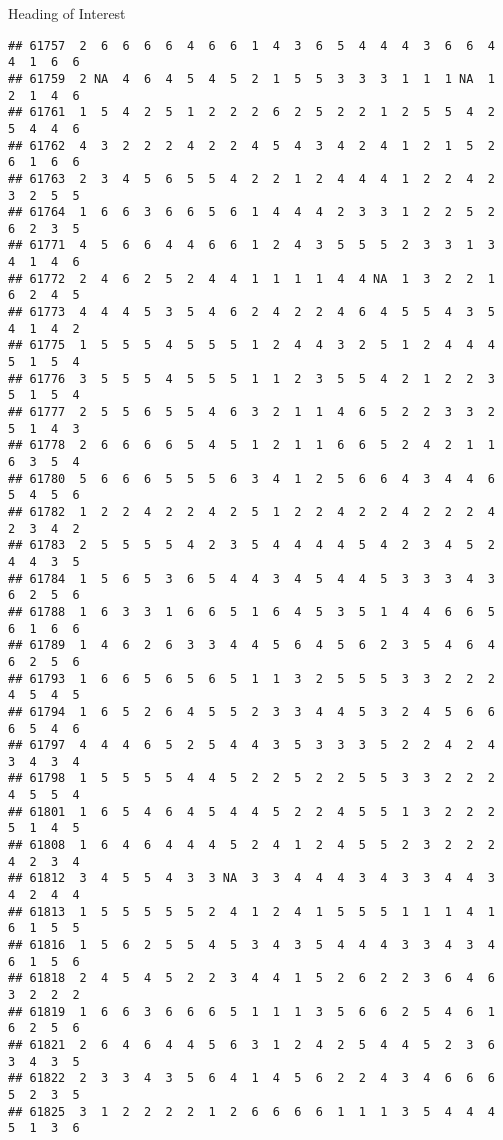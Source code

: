 \documentclass[
  ignorenonframetext,
]{beamer}
\begin{document}
\begin{frame}[fragile]{Heading of Interest}
\begin{verbatim}
## 61757  2  6  6  6  6  4  6  6  1  4  3  6  5  4  4  4  3  6  6  4  4  1  6  6
## 61759  2 NA  4  6  4  5  4  5  2  1  5  5  3  3  3  1  1  1 NA  1  2  1  4  6
## 61761  1  5  4  2  5  1  2  2  2  6  2  5  2  2  1  2  5  5  4  2  5  4  4  6
## 61762  4  3  2  2  2  4  2  2  4  5  4  3  4  2  4  1  2  1  5  2  6  1  6  6
## 61763  2  3  4  5  6  5  5  4  2  2  1  2  4  4  4  1  2  2  4  2  3  2  5  5
## 61764  1  6  6  3  6  6  5  6  1  4  4  4  2  3  3  1  2  2  5  2  6  2  3  5
## 61771  4  5  6  6  4  4  6  6  1  2  4  3  5  5  5  2  3  3  1  3  4  1  4  6
## 61772  2  4  6  2  5  2  4  4  1  1  1  1  4  4 NA  1  3  2  2  1  6  2  4  5
## 61773  4  4  4  5  3  5  4  6  2  4  2  2  4  6  4  5  5  4  3  5  4  1  4  2
## 61775  1  5  5  5  4  5  5  5  1  2  4  4  3  2  5  1  2  4  4  4  5  1  5  4
## 61776  3  5  5  5  4  5  5  5  1  1  2  3  5  5  4  2  1  2  2  3  5  1  5  4
## 61777  2  5  5  6  5  5  4  6  3  2  1  1  4  6  5  2  2  3  3  2  5  1  4  3
## 61778  2  6  6  6  6  5  4  5  1  2  1  1  6  6  5  2  4  2  1  1  6  3  5  4
## 61780  5  6  6  6  5  5  5  6  3  4  1  2  5  6  6  4  3  4  4  6  5  4  5  6
## 61782  1  2  2  4  2  2  4  2  5  1  2  2  4  2  2  4  2  2  2  4  2  3  4  2
## 61783  2  5  5  5  5  4  2  3  5  4  4  4  4  5  4  2  3  4  5  2  4  4  3  5
## 61784  1  5  6  5  3  6  5  4  4  3  4  5  4  4  5  3  3  3  4  3  6  2  5  6
## 61788  1  6  3  3  1  6  6  5  1  6  4  5  3  5  1  4  4  6  6  5  6  1  6  6
## 61789  1  4  6  2  6  3  3  4  4  5  6  4  5  6  2  3  5  4  6  4  6  2  5  6
## 61793  1  6  6  5  6  5  6  5  1  1  3  2  5  5  5  3  3  2  2  2  4  5  4  5
## 61794  1  6  5  2  6  4  5  5  2  3  3  4  4  5  3  2  4  5  6  6  6  5  4  6
## 61797  4  4  4  6  5  2  5  4  4  3  5  3  3  3  5  2  2  4  2  4  3  4  3  4
## 61798  1  5  5  5  5  4  4  5  2  2  5  2  2  5  5  3  3  2  2  2  4  5  5  4
## 61801  1  6  5  4  6  4  5  4  4  5  2  2  4  5  5  1  3  2  2  2  5  1  4  5
## 61808  1  6  4  6  4  4  4  5  2  4  1  2  4  5  5  2  3  2  2  2  4  2  3  4
## 61812  3  4  5  5  4  3  3 NA  3  3  4  4  4  3  4  3  3  4  4  3  4  2  4  4
## 61813  1  5  5  5  5  5  2  4  1  2  4  1  5  5  5  1  1  1  4  1  6  1  5  5
## 61816  1  5  6  2  5  5  4  5  3  4  3  5  4  4  4  3  3  4  3  4  6  1  5  6
## 61818  2  4  5  4  5  2  2  3  4  4  1  5  2  6  2  2  3  6  4  6  3  2  2  2
## 61819  1  6  6  3  6  6  6  5  1  1  1  3  5  6  6  2  5  4  6  1  6  2  5  6
## 61821  2  6  4  6  4  4  5  6  3  1  2  4  2  5  4  4  5  2  3  6  3  4  3  5
## 61822  2  3  3  4  3  5  6  4  1  4  5  6  2  2  4  3  4  6  6  6  5  2  3  5
## 61825  3  1  2  2  2  2  1  2  6  6  6  6  1  1  1  3  5  4  4  4  5  1  3  6

\end{verbatim}
\end{frame}
\end{document}
